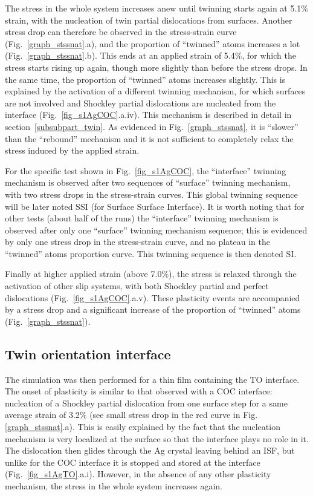 \documentclass[final,3p,times,twocolumn]{elsarticle}
\begin{document}
The stress in the whole system increases anew until twinning starts again at 5.1\% strain, with the nucleation of twin partial dislocations from surfaces. Another stress drop can therefore be observed in the stress-strain curve (Fig.~\ref{graph_stssnat}.a), and the proportion of ``twinned'' atoms increases a lot (Fig.~\ref{graph_stssnat}.b). This ends at an applied strain of 5.4\%, for which the stress starts rising up again, though more slightly than before the stress drops. In the same time, the proportion of ``twinned'' atoms increases slightly. This is explained by the activation of a different twinning mechanism, for which surfaces are not involved and Shockley partial dislocations are nucleated from the interface (Fig.~\ref{fig_s1AgCOC}.a.iv). This mechanism is described in detail in section~\ref{subsubpart_twin}. As evidenced in Fig.~\ref{graph_stssnat}, it is ``slower'' than the ``rebound'' mechanism and it is not sufficient to completely relax the stress induced by the applied strain.

For the specific test shown in Fig.~\ref{fig_s1AgCOC}, the ``interface'' twinning mechanism is observed after two sequences of ``surface'' twinning mechanism, with two stress drops in the stress-strain curves. This global twinning sequence will be later noted SSI (for Surface Surface Interface). It is worth noting that for other tests (about half of the runs) the ``interface'' twinning mechanism is observed after only one ``surface'' twinning mechanism sequence; this is evidenced by only one stress drop in the stress-strain curve, and no plateau in the ``twinned'' atoms proportion curve. This twinning sequence is then denoted SI.

Finally at higher applied strain (above 7.0\%), the stress is relaxed through the activation of other slip systems, with both Shockley partial and perfect dislocations (Fig.~\ref{fig_s1AgCOC}.a.v). These plasticity events are  accompanied by a stress drop and a significant increase of the proportion of ``twinned'' atoms (Fig.~\ref{graph_stssnat}).

	\subsection{Twin orientation interface}\label{subsubpart_sAg2}
	
The simulation was then performed for a thin film containing the TO interface. The onset of plasticity is similar to that observed with a COC interface: nucleation of a Shockley partial dislocation from one surface step for a same average strain of 3.2\% (see small stress drop in the red curve in Fig.\ref{graph_stssnat}.a). This is easily explained by the fact that the nucleation mechanism is very localized at the surface so that the interface plays no role in it. The dislocation then glides through the Ag crystal leaving behind an ISF, but unlike for the COC interface it is stopped and stored at the interface (Fig.~\ref{fig_s1AgTO}.a.i). However, in the absence of any other plasticity mechanism, the stress in the whole system increases again.
 
\end{document}
